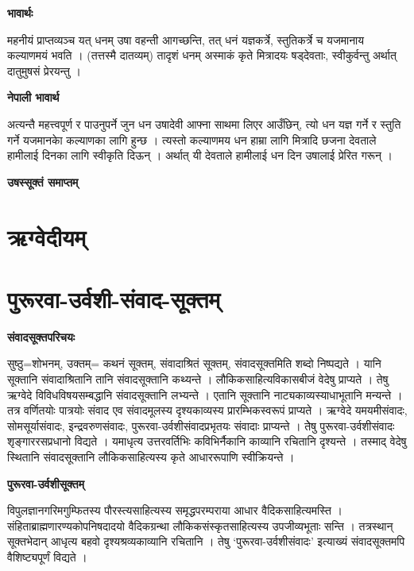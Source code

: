 \documentclass[11pt, a5paper]{article}
\begin{document}
\textbf{भावार्थः}

महनीयं प्राप्तव्यञ्च यत् धनम् उषा वहन्ती आगच्छन्ति, तत् धनं यज्ञकर्त्रे, स्तुतिकर्त्रे च यजमानाय कल्याणमयं भवति । (तत्तस्मै दातव्यम्) तादृशं धनम् अस्माकं कृते मित्रादयः षड्‌देवताः, स्वीकुर्वन्तु अर्थात् दातुमुषसं प्रेरयन्तु ।

\textbf{नेपाली भावार्थ}

अत्यन्तै महत्त्वपूर्ण र पाउनुपर्ने जुन धन उषादेवी आफ्ना साथमा लिएर आउँछिन्, त्यो धन यज्ञ गर्ने र स्तुति गर्ने यजमानकाे कल्याणका लागि हुन्छ । त्यस्तो कल्याणमय धन हाम्रा लागि मित्रादि छजना देवताले हामीलाई दिनका लागि स्वीकृति दिऊन् । अर्थात् यी देवताले हामीलाई धन दिन उषालाई प्रेरित गरून् ।

\textbf{उषस्सूक्तं समाप्तम्}

\section{}

\section{\textbf{ऋग्वेदीयम्}}

\section{\textbf{पुरूरवा-उर्वशी-संवाद-सूक्तम्}}

\textbf{संवादसूक्तपरिचयः}

सुष्ठु=शोभनम्, उक्तम्= कथनं सूक्तम्, संवादाश्रितं सूक्तम्, संवादसूक्तमिति शब्दो निष्पद्यते । यानि सूक्तानि संवादाश्रितानि तानि संवादसूक्तानि कथ्यन्ते । लौकिकसाहित्यविकासबीजं वेदेषु प्राप्यते । तेषु ऋग्वेदे विविधविषयसम्बद्धानि  संवादसूक्तानि लभ्यन्ते । एतानि सूक्तानि नाट्यकाव्यस्याधाभूतानि मन्यन्ते । तत्र वर्णितयोः पात्रयोः संवाद एव संवादमूलस्य दृश्यकाव्यस्य प्रारम्भिकस्वरूपं प्राप्यते । ऋग्वेदे यमयमीसंवादः, सोमसूर्यासंवादः, इन्द्रवरुणसंवादः, पुरूरवा-उर्वशीसंवादप्रभृतयः संवादाः प्राप्यन्ते । तेेषु पुरूरवा-उर्वशीसंवादः शृङ्गाररसप्रधानो विद्यते । यमाधृत्य उत्तरवर्तिभिः कविभिर्नैकानि काव्यानि रचितानि दृश्यन्ते । तस्माद् वेदेषु स्थितानि संवादसूक्तानि लौकिकसाहित्यस्य कृते आधाररूपाणि स्वीक्रियन्ते ।

\textbf{पुरूरवा-उर्वशीसूक्तम्}

विपुलज्ञानगरिमगुम्फितस्य पौरस्त्यसाहित्यस्य समृद्धपरम्पराया आधार वैदिकसाहित्यमस्ति । संहिताब्राह्मणारण्यकोपनिषदादयो वैदिकग्रन्था लौकिकसंस्कृतसाहित्यस्य उपजीव्यभूताः सन्ति । तत्रस्थान् सूक्तभेदान् आधृत्य बहवो दृश्यश्रव्यकाव्यानि रचितानि । तेषु ‘पुरूरवा-उर्वशीसंवादः’ इत्याख्यं संवादसूक्तमपि वैशिष्ट्यपूर्णं विद्यते ।
\end{document}
